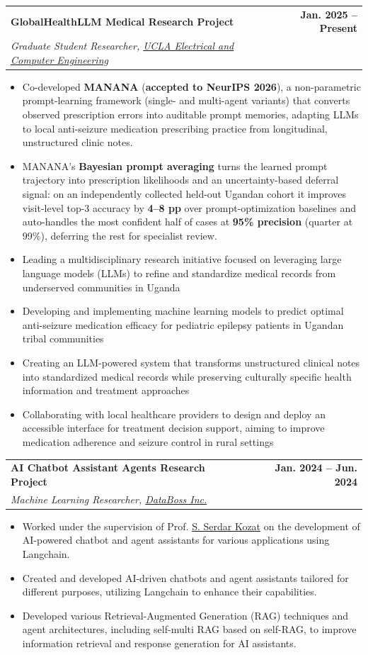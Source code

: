 \documentclass[letterpaper,11pt]{article}
\makeatletter
\newcommand{\resumeItem}[1]{
  \item\small{
    {#1 \vspace{1.2pt}}
  }
}
\newcommand{\resumeSubheading}[4]{
  \vspace{5pt}\item
    \begin{tabular*}{1.0\textwidth}[t]{l@{\extracolsep{\fill}}r}
      \textbf{#1} & \textbf{\small #2} \\
      \emph{\small#3} & \emph{\small #4} \\
    \end{tabular*}\vspace{-5pt}
}
\newcommand{\resumeItemListStart}{\begin{itemize}}
\newcommand{\resumeItemListEnd}{\end{itemize}\vspace{-5pt}}
\makeatother
\begin{document}
        \resumeSubheading{GlobalHealthLLM Medical Research Project}{Jan. 2025 -- Present}{Graduate Student Researcher, \href{https://www.ee.ucla.edu/}{UCLA Electrical and Computer Engineering}}{}
        \resumeItemListStart
            \resumeItem{Co-developed \textbf{MANANA} (\textbf{accepted to NeurIPS 2026}), a non-parametric prompt-learning framework (single- and multi-agent variants) that converts observed prescription errors into auditable prompt memories, adapting LLMs to local anti-seizure medication prescribing practice from longitudinal, unstructured clinic notes.}
            \resumeItem{MANANA's \textbf{Bayesian prompt averaging} turns the learned prompt trajectory into prescription likelihoods and an uncertainty-based deferral signal: on an independently collected held-out Ugandan cohort it improves visit-level top-3 accuracy by \textbf{4--8 pp} over prompt-optimization baselines and auto-handles the most confident half of cases at \textbf{95\% precision} (quarter at 99\%), deferring the rest for specialist review.}
            \resumeItem{Leading a multidisciplinary research initiative focused on leveraging large language models (LLMs) to refine and standardize medical records from underserved communities in Uganda}
            \resumeItem{Developing and implementing machine learning models to predict optimal anti-seizure medication efficacy for pediatric epilepsy patients in Ugandan tribal communities}
            \resumeItem{Creating an LLM-powered system that transforms unstructured clinical notes into standardized medical records while preserving culturally specific health information and treatment approaches}
            \resumeItem{Collaborating with local healthcare providers to design and deploy an accessible interface for treatment decision support, aiming to improve medication adherence and seizure control in rural settings}
        \resumeItemListEnd

        \resumeSubheading{AI Chatbot Assistant Agents Research Project}{Jan. 2024 -- Jun. 2024}{Machine Learning Researcher, \href{https://www.data-boss.com.tr/tr/}{DataBoss Inc.}}{}
            \resumeItemListStart
            \resumeItem{Worked under the supervision of Prof. \href{https://kilyos.ee.bilkent.edu.tr/~kozat/}{S. Serdar Kozat} on the development of AI-powered chatbot and agent assistants for various applications using Langchain.} \\
            \resumeItem{Created and developed AI-driven chatbots and agent assistants tailored for different purposes, utilizing Langchain to enhance their capabilities.} \\
            \resumeItem{Developed various Retrieval-Augmented Generation (RAG) techniques and agent architectures, including self-multi RAG based on self-RAG, to improve information retrieval and response generation for AI assistants.} \\
            \resumeItemListEnd
            
\end{document}
